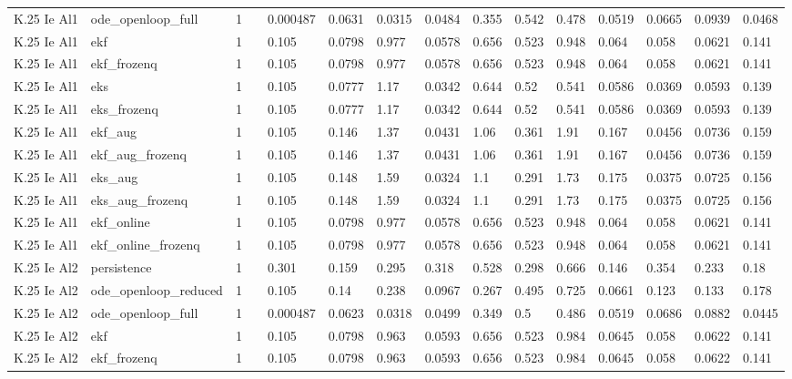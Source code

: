 \begin{table}[t]
\begin{tabular}{lllllllllllllll}
K.25 Ie Al1 & ode\_openloop\_full & 1 &  & 0.000487 & 0.0631 & 0.0315 & 0.0484 & 0.355 & 0.542 & 0.478 & 0.0519 & 0.0665 & 0.0939 & 0.0468 \\
K.25 Ie Al1 & ekf & 1 &  & 0.105 & 0.0798 & 0.977 & 0.0578 & 0.656 & 0.523 & 0.948 & 0.064 & 0.058 & 0.0621 & 0.141 \\
K.25 Ie Al1 & ekf\_frozenq & 1 &  & 0.105 & 0.0798 & 0.977 & 0.0578 & 0.656 & 0.523 & 0.948 & 0.064 & 0.058 & 0.0621 & 0.141 \\
K.25 Ie Al1 & eks & 1 &  & 0.105 & 0.0777 & 1.17 & 0.0342 & 0.644 & 0.52 & 0.541 & 0.0586 & 0.0369 & 0.0593 & 0.139 \\
K.25 Ie Al1 & eks\_frozenq & 1 &  & 0.105 & 0.0777 & 1.17 & 0.0342 & 0.644 & 0.52 & 0.541 & 0.0586 & 0.0369 & 0.0593 & 0.139 \\
K.25 Ie Al1 & ekf\_aug & 1 &  & 0.105 & 0.146 & 1.37 & 0.0431 & 1.06 & 0.361 & 1.91 & 0.167 & 0.0456 & 0.0736 & 0.159 \\
K.25 Ie Al1 & ekf\_aug\_frozenq & 1 &  & 0.105 & 0.146 & 1.37 & 0.0431 & 1.06 & 0.361 & 1.91 & 0.167 & 0.0456 & 0.0736 & 0.159 \\
K.25 Ie Al1 & eks\_aug & 1 &  & 0.105 & 0.148 & 1.59 & 0.0324 & 1.1 & 0.291 & 1.73 & 0.175 & 0.0375 & 0.0725 & 0.156 \\
K.25 Ie Al1 & eks\_aug\_frozenq & 1 &  & 0.105 & 0.148 & 1.59 & 0.0324 & 1.1 & 0.291 & 1.73 & 0.175 & 0.0375 & 0.0725 & 0.156 \\
K.25 Ie Al1 & ekf\_online & 1 &  & 0.105 & 0.0798 & 0.977 & 0.0578 & 0.656 & 0.523 & 0.948 & 0.064 & 0.058 & 0.0621 & 0.141 \\
K.25 Ie Al1 & ekf\_online\_frozenq & 1 &  & 0.105 & 0.0798 & 0.977 & 0.0578 & 0.656 & 0.523 & 0.948 & 0.064 & 0.058 & 0.0621 & 0.141 \\
K.25 Ie Al2 & persistence & 1 &  & 0.301 & 0.159 & 0.295 & 0.318 & 0.528 & 0.298 & 0.666 & 0.146 & 0.354 & 0.233 & 0.18 \\
K.25 Ie Al2 & ode\_openloop\_reduced & 1 &  & 0.105 & 0.14 & 0.238 & 0.0967 & 0.267 & 0.495 & 0.725 & 0.0661 & 0.123 & 0.133 & 0.178 \\
K.25 Ie Al2 & ode\_openloop\_full & 1 &  & 0.000487 & 0.0623 & 0.0318 & 0.0499 & 0.349 & 0.5 & 0.486 & 0.0519 & 0.0686 & 0.0882 & 0.0445 \\
K.25 Ie Al2 & ekf & 1 &  & 0.105 & 0.0798 & 0.963 & 0.0593 & 0.656 & 0.523 & 0.984 & 0.0645 & 0.058 & 0.0622 & 0.141 \\
K.25 Ie Al2 & ekf\_frozenq & 1 &  & 0.105 & 0.0798 & 0.963 & 0.0593 & 0.656 & 0.523 & 0.984 & 0.0645 & 0.058 & 0.0622 & 0.141 \\

\end{tabular}
\end{table}
